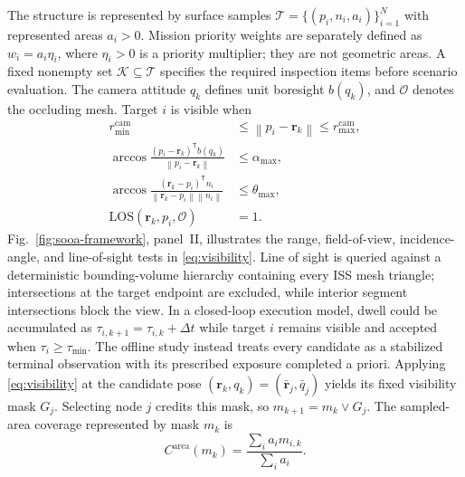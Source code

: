 \documentclass{IEEEtaes}
\newcommand{\dt}{\Delta t}
\newcommand{\norm}[1]{\left\lVert #1 \right\rVert}
\newcommand{\los}{\mathrm{LOS}}
\theoremstyle{remark}
\theoremstyle{plain}
\begin{document}
The structure is represented by surface samples $\mathcal T=\{(p_i,n_i,a_i)\}_{i=1}^{N}$ with represented areas $a_i>0$. Mission priority weights are separately defined as $w_i=a_i\eta_i$, where $\eta_i>0$ is a priority multiplier; they are not geometric areas. A fixed nonempty set $\mathcal K\subseteq\mathcal T$ specifies the required inspection items before scenario evaluation. The camera attitude $q_k$ defines unit boresight $b(q_k)$, and $\mathcal O$ denotes the occluding mesh. Target $i$ is visible when
\begin{align}
  r_{\min}^{\mathrm{cam}}&\le\norm{p_i-\mathbf r_k}\le r_{\max}^{\mathrm{cam}},\nonumber\\
  \arccos\!\frac{(p_i-\mathbf r_k)^{\mathsf T}b(q_k)}
  {\norm{p_i-\mathbf r_k}}&\le\alpha_{\max},\nonumber\\
  \arccos\!\frac{(\mathbf r_k-p_i)^{\mathsf T}n_i}
  {\norm{\mathbf r_k-p_i}\norm{n_i}}&\le\theta_{\max},\nonumber\\
  \los(\mathbf r_k,p_i,\mathcal O)&=1.
  \label{eq:visibility}
\end{align}
Fig.~\ref{fig:sooa-framework}, panel~II, illustrates the range, field-of-view, incidence-angle, and line-of-sight tests in \eqref{eq:visibility}. Line of sight is queried against a deterministic bounding-volume hierarchy containing every ISS mesh triangle; intersections at the target endpoint are excluded, while interior segment intersections block the view. In a closed-loop execution model, dwell could be accumulated as $\tau_{i,k+1}=\tau_{i,k}+\dt$ while target $i$ remains visible and accepted when $\tau_i\ge\tau_{\min}$. The offline study instead treats every candidate as a stabilized terminal observation with its prescribed exposure completed a priori. Applying \eqref{eq:visibility} at the candidate pose $(\mathbf r_k,q_k)=(\bar{\mathbf r}_j,\bar q_j)$ yields its fixed visibility mask $G_j$. Selecting node $j$ credits this mask, so $m_{k+1}=m_k\lor G_j$. The sampled-area coverage represented by mask $m_k$ is
\begin{equation}
  C^{\mathrm{area}}(m_k)=\frac{\sum_i a_i m_{i,k}}{\sum_i a_i}.
  \label{eq:coverage}
\end{equation}
\end{document}

